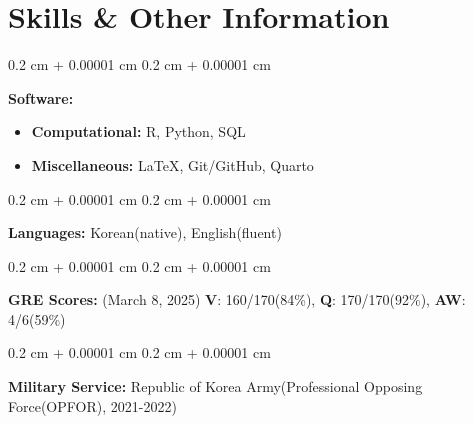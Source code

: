 \documentclass[10pt, letterpaper]{article}
\newenvironment{onecolentry}{
	\begin{adjustwidth}{
			0.2 cm + 0.00001 cm
		}{
			0.2 cm + 0.00001 cm
		}
	}{
	\end{adjustwidth}
} %
\begin{document}
\vspace{12pt}

	\section{Skills \& Other Information}
	
	\begin{onecolentry}
		\textbf{Software:} 
		\begin{itemize}
			\item \textbf{Computational:} R, Python, SQL
			\item \textbf{Miscellaneous:} \LaTeX, Git/GitHub, Quarto
		\end{itemize}
	\end{onecolentry}
	
	
	\vspace{0.2 cm}
	
	\begin{onecolentry}
		\textbf{Languages:} Korean(native), English(fluent)
	\end{onecolentry}
	
	\vspace{0.2 cm}
	
	\begin{onecolentry}
		\textbf{GRE Scores:} (March 8, 2025) \textbf{V}: 160/170(84\%), \textbf{Q}: 170/170(92\%), \textbf{AW}: 4/6(59\%)
	\end{onecolentry}
	
	\vspace{0.2 cm}

	\begin{onecolentry}
		\textbf{Military Service:} Republic of Korea Army(Professional Opposing Force(OPFOR), 2021-2022)
	\end{onecolentry}
	
\end{document}
